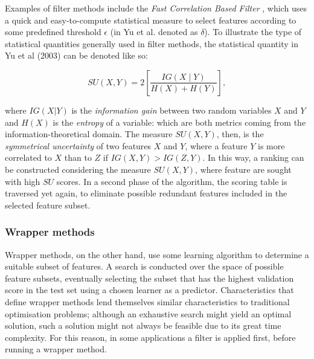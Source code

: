 \documentclass[../main.tex]{subfiles}
\begin{document}
Examples of filter methods include the \textit{Fast Correlation Based Filter} \citep{yu_feature_2003}, which uses a quick and easy-to-compute statistical measure to select features according to some predefined threshold $\epsilon$ (in Yu et al. denoted as $\delta$). To illustrate the type of statistical quantities generally used in filter methods, the statistical quantity in Yu et al (2003) can be denoted like so:

\begin{equation}
S U(X, Y)=2\left[\frac{I G(X \mid Y)}{H(X)+H(Y)}\right],
\end{equation}

where $I G(X|Y)$ is the \textit{information gain} between two random variables $X$ and $Y$ and $H(X)$ is the \textit{entropy} of a variable: which are both metrics coming from the information-theoretical domain. The measure $SU(X, Y)$, then, is the \textit{symmetrical uncertainty} of two features $X$ and $Y$, where a feature $Y$ is more correlated to $X$ than to $Z$ if $IG(X, Y) > IG(Z, Y)$. In this way, a ranking can be constructed considering the measure $SU(X, Y)$, where feature are sought with high $SU$ scores. In a second phase of the algorithm, the scoring table is traversed yet again, to eliminate possible redundant features included in the selected feature subset.



\subsubsection{Wrapper methods}
Wrapper methods, on the other hand, use some learning algorithm to determine a suitable subset of features. A search is conducted over the space of possible feature subsets, eventually selecting the subset that has the highest validation score in the test set using a chosen learner as a predictor. Characteristics that define wrapper methods lend themselves similar characteristics to traditional optimisation problems; although an exhaustive search might yield an optimal solution, such a solution might not always be feasible due to its great time complexity. For this reason, in some applications a filter is applied first, before running a wrapper method.
\end{document}
